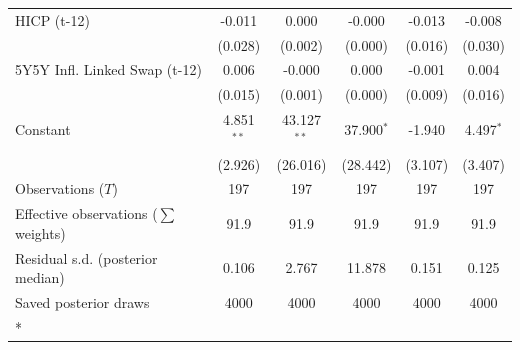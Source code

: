 \begin{longtable}[t]{lccccc}
HICP (t-12) & -0.011 & 0.000 & -0.000 & -0.013 & -0.008\\
 & (0.028) & (0.002) & (0.000) & (0.016) & (0.030)\\
5Y5Y Infl. Linked Swap (t-12) & 0.006 & -0.000 & 0.000 & -0.001 & 0.004\\
 & (0.015) & (0.001) & (0.000) & (0.009) & (0.016)\\
Constant & 4.851$^{**}$ & 43.127$^{**}$ & 37.900$^{*}$ & -1.940 & 4.497$^{*}$\\
 & (2.926) & (26.016) & (28.442) & (3.107) & (3.407)\\
\midrule
Observations ($T$) & 197 & 197 & 197 & 197 & 197\\
Effective observations ($\sum$ weights) & 91.9 & 91.9 & 91.9 & 91.9 & 91.9\\
Residual s.d. (posterior median) & 0.106 & 2.767 & 11.878 & 0.151 & 0.125\\
Saved posterior draws & 4000 & 4000 & 4000 & 4000 & 4000\\*
\end{longtable}
\endgroup{}

\begingroup\fontsize{7}{9}\selectfont

